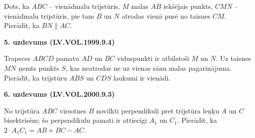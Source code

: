 \documentclass[a4paper]{article}
\begin{document}
Dots, ka $ABC$ -- vienādmalu trijstūris, $M$ malas $AB$ iekšējais punkts, $CMN$ --
vienādmalu trijstūris, pie tam $B$ un $N$ atrodas vienā pusē no taisnes $CM$. 
Pierādīt, ka $BN \| AC$. 


\vspace{10pt}

\noindent
{\bfseries 5. uzdevums (LV.VOL.1999.9.4)}

Trapeces $ABCD$ pamatu $AD$ un $BC$ viduspunkti ir atbilstoši $M$ un $N$. Uz taisnes
$MN$ ņemts punkts $S$, kas neatrodas ne uz vienas sānu malas pagarinājuma. Pierādīt, ka
trijstūru $ABS$ un $CDS$ laukumi ir vienādi. 


\vspace{10pt}

\noindent
{\bfseries 6. uzdevums (LV.VOL.2000.9.3)}

No trijstūra $ABC$ virsotnes $B$ novilkti perpendikuli pret
trijstūra leņķu $A$ un $C$ bisektrisēm; šo perpendikulu pamati ir
attiecīgi $A_1$ un $C_1$. Pierādīt, ka $2\cdot A_1C_1 = AB + BC - AC$. 
\end{document}
